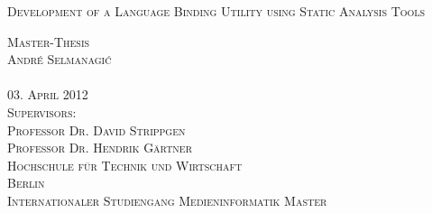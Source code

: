 \thispagestyle{empty}


\begin{center}

\vspace*{2cm}
\Large
\textsc{Development of a Language Binding Utility using Static Analysis Tools}\\

\vspace{3cm}

\textsc{Master-Thesis\\[0.5\baselineskip]
André Selmanagi\'{c}\\
{\normalsize \textsc{}}}\\

\vspace{3cm}
\textsc{03. April 2012}\\ %

\vspace{1cm}
\textsc{Supervisors:\\
Professor Dr. David Strippgen\\
Professor Dr. Hendrik Gärtner}\\

\vspace{1cm}
\textsc{Hochschule für Technik und Wirtschaft\\
Berlin\\
Internationaler Studiengang Medieninformatik Master}

\end{center}

\addtocounter{page}{-1}
